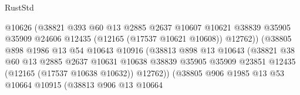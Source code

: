 \begin{lexlean}{RustStd}
\begin{coremodule}
                                        @10626
                                        (@38821
                                          @393
                                          @60
                                          @13
                                          @2885
                                          @2637
                                          @10607
                                          @10621
                                          @38839
                                          @35905
                                          @35909
                                          @24606
                                          @12435
                                          (@12165 (@17537 @10621 @10608))
                                          @12762))
                                      (@38805
                                        @898
                                        @1986
                                        @13
                                        @54
                                        @10643
                                        @10916
                                        (@38813
                                          @898
                                          @13
                                          @10643
                                          (@38821
                                            @38
                                            @60
                                            @13
                                            @2885
                                            @2637
                                            @10631
                                            @10638
                                            @38839
                                            @35905
                                            @35909
                                            @23851
                                            @12435
                                            (@12165 (@17537 @10638 @10632))
                                            @12762))
                                        (@38805
                                          @906
                                          @1985
                                          @13
                                          @53
                                          @10664
                                          @10915
                                          (@38813
                                            @906
                                            @13
                                            @10664

\end{coremodule}
\end{lexlean}
